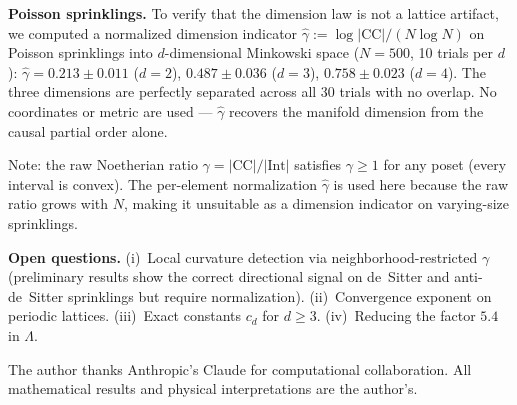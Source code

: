 \documentclass[aps,prl,twocolumn,superscriptaddress]{revtex4-2}
\begin{document}
\textbf{Poisson sprinklings.} To verify that the dimension law is
not a lattice artifact, we computed a normalized dimension
indicator $\hat{\gamma} := \log|\mathrm{CC}| / (N \log N)$ on Poisson sprinklings
into $d$-dimensional Minkowski space ($N = 500$, 10 trials per $d$):
$\hat{\gamma} = 0.213 \pm 0.011$ ($d=2$), $0.487 \pm 0.036$ ($d=3$),
$0.758 \pm 0.023$ ($d=4$). The three dimensions are perfectly
separated across all 30 trials with no overlap. No coordinates or
metric are used --- $\hat{\gamma}$ recovers the manifold dimension from
the causal partial order alone.

Note: the raw Noetherian ratio $\gamma = |\mathrm{CC}|/|\mathrm{Int}|$ satisfies
$\gamma \geq 1$ for any poset (every interval is convex).
The per-element normalization $\hat{\gamma}$ is used here because
the raw ratio grows with $N$, making it unsuitable as a
dimension indicator on varying-size sprinklings.

\textbf{Open questions.}
(i)~Local curvature detection via neighborhood-restricted $\gamma$
(preliminary results show the correct directional signal on de~Sitter
and anti-de~Sitter sprinklings but require normalization).
(ii)~Convergence exponent on periodic lattices.
(iii)~Exact constants $c_d$ for $d \geq 3$.
(iv)~Reducing the factor $5.4$ in $\Lambda$.

\begin{acknowledgments}
The author thanks Anthropic's Claude for computational collaboration.
All mathematical results and physical interpretations are the author's.
\end{acknowledgments}
\end{document}
